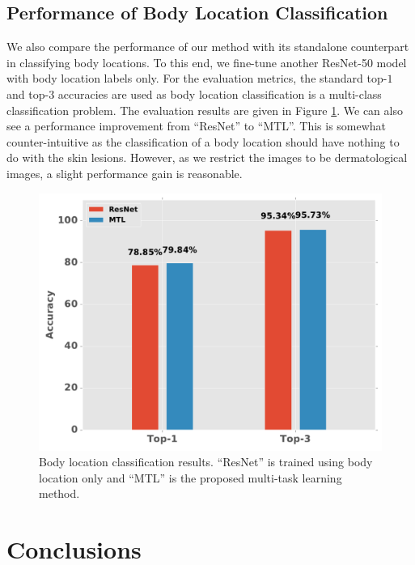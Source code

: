 \documentclass[letterpaper]{article}
\begin{document}
\subsection{Performance of Body Location Classification}

We also compare the performance of our method with its standalone counterpart
in classifying body locations. To this end, we fine-tune another ResNet-50 model
with body location labels only. For the evaluation metrics, the standard
top-$1$ and top-$3$ accuracies are used as body location classification is a
multi-class classification problem. The evaluation results are given in Figure
\ref{fig: body performance}. We can also see a performance improvement
from ``ResNet'' to ``MTL''. This is somewhat counter-intuitive as the classification
of a body location should have nothing to do with the skin lesions. However, as
we restrict the images to be dermatological images, a slight performance gain 
is reasonable.

\begin{figure}[!ht]
  \centering
  \includegraphics[scale=0.38]{body_location_performance.pdf}
  \caption{Body location classification results. ``ResNet'' is trained using body
  location only and ``MTL'' is the proposed multi-task learning method.}
  \label{fig: body performance}
\end{figure}

\section{Conclusions}
\end{document}
